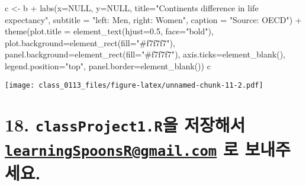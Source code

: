 \documentclass[a4paper]{article}
\newenvironment{Shaded}{}{}
\newcommand{\KeywordTok}[1]{\textcolor[rgb]{0.00,0.00,1.00}{#1}}
\newcommand{\DataTypeTok}[1]{#1}
\newcommand{\FloatTok}[1]{#1}
\newcommand{\StringTok}[1]{\textcolor[rgb]{0.00,0.50,0.50}{#1}}
\newcommand{\OtherTok}[1]{\textcolor[rgb]{1.00,0.25,0.00}{#1}}
\newcommand{\OperatorTok}[1]{#1}
\newcommand{\NormalTok}[1]{#1}
\begin{document}
\begin{Shaded}
\begin{Highlighting}[]
\NormalTok{c <-}\StringTok{ }\NormalTok{b }\OperatorTok{+}\StringTok{ }
\StringTok{  }\KeywordTok{labs}\NormalTok{(}\DataTypeTok{x=}\OtherTok{NULL}\NormalTok{, }\DataTypeTok{y=}\OtherTok{NULL}\NormalTok{, }\DataTypeTok{title=}\StringTok{"Continents difference in life expectancy"}\NormalTok{,}
       \DataTypeTok{subtitle =} \StringTok{"left: Men, right: Women"}\NormalTok{,}
       \DataTypeTok{caption =} \StringTok{"Source: OECD"}\NormalTok{) }\OperatorTok{+}
\StringTok{  }\KeywordTok{theme}\NormalTok{(}\DataTypeTok{plot.title =} \KeywordTok{element_text}\NormalTok{(}\DataTypeTok{hjust=}\FloatTok{0.5}\NormalTok{, }\DataTypeTok{face=}\StringTok{"bold"}\NormalTok{),}
        \DataTypeTok{plot.background=}\KeywordTok{element_rect}\NormalTok{(}\DataTypeTok{fill=}\StringTok{"#f7f7f7"}\NormalTok{),}
        \DataTypeTok{panel.background=}\KeywordTok{element_rect}\NormalTok{(}\DataTypeTok{fill=}\StringTok{"#f7f7f7"}\NormalTok{),}
        \DataTypeTok{axis.ticks=}\KeywordTok{element_blank}\NormalTok{(),}
        \DataTypeTok{legend.position=}\StringTok{"top"}\NormalTok{,}
        \DataTypeTok{panel.border=}\KeywordTok{element_blank}\NormalTok{())}
\NormalTok{c}
\end{Highlighting}
\end{Shaded}

\texttt{[image: class\_0113\_files/figure-latex/unnamed-chunk-11-2.pdf]}

\section{\texorpdfstring{18. \texttt{classProject1.R}을 저장해서
\href{mailto:learningSpoonsR@gmail.com}{\nolinkurl{learningSpoonsR@gmail.com}}
로
보내주세요.}{18. classProject1.R을 저장해서 learningSpoonsR@gmail.com 로 보내주세요.}}\label{classproject1.r--learningspoonsrgmail.com--.}
\end{document}
